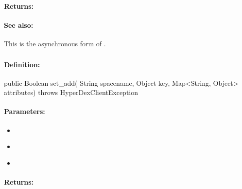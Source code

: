\paragraph{Returns:}


\paragraph{See also:}  This is the asynchronous form of .

\pagebreak
\subsubsection{}
\label{api:java:set_add}


\paragraph{Definition:}
\begin{javacode}
public Boolean set_add(
        String spacename,
        Object key,
        Map<String, Object> attributes) throws HyperDexClientException
\end{javacode}

\paragraph{Parameters:}
\begin{itemize}[noitemsep]
\item {}\\

\item {}\\

\item {}\\

\end{itemize}

\paragraph{Returns:}


\pagebreak
